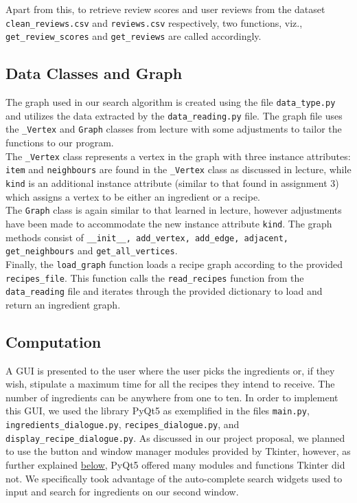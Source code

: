 \documentclass[fontsize=11pt]{article}
\begin{document}
    Apart from this, to retrieve review scores and user reviews from the dataset \texttt{clean\_reviews.csv} and \texttt{reviews.csv} respectively, two functions, viz., \texttt{get\_review\_scores} and \texttt{get\_reviews} are called accordingly. \\


    \subsection*{Data Classes and Graph}
    The graph used in our search algorithm is created using the file \texttt{data\_type.py} and utilizes the data extracted by the \texttt{data\_reading.py} file. The graph file uses the \texttt{\_Vertex} and \texttt{Graph} classes from lecture with some adjustments to tailor the functions to our program. \\

    The \texttt{\_Vertex} class represents a vertex in the graph with three instance attributes: \texttt{item} and \texttt{neighbours} are found in the \texttt{\_Vertex} class as discussed in lecture, while \texttt{kind} is an additional instance attribute (similar to that found in assignment 3) which assigns a vertex to be either an ingredient or a recipe. \\

    The \texttt{Graph} class is again similar to that learned in lecture, however adjustments have been made to accommodate the new instance attribute \texttt{kind}. The graph methods consist of \texttt{\_\_init\_\_, add\_vertex, add\_edge, adjacent, get\_neighbours} and \texttt{get\_all\_vertices}. \\

    Finally, the \texttt{load\_graph} function loads a recipe graph according to the provided \texttt{recipes\_file}. This function calls the \texttt{read\_recipes} function from the \texttt{data\_reading} file and iterates through the provided dictionary to load and return an ingredient graph.

    \subsection*{Computation}

    A GUI is presented to the user where the user picks the ingredients or, if they wish, stipulate a maximum time for all the recipes they intend to receive. The number of ingredients can be anywhere from one to ten. In order to implement this GUI, we used the library PyQt5 as exemplified in the files \texttt{main.py}, \texttt{ingredients\_dialogue.py}, \texttt{recipes\_dialogue.py}, and \texttt{display\_recipe\_dialogue.py}. As discussed in our project proposal, we planned to use the button and window manager modules provided by Tkinter, however, as further explained \hyperref[sec:pyqt5]{below}, PyQt5 offered many modules and functions Tkinter did not. We specifically took advantage of the auto-complete search widgets used to input and search for ingredients on our second window. \\
\end{document}
